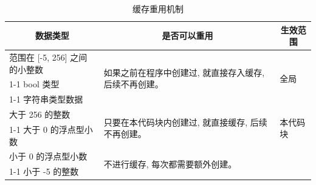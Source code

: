 \begin{table}[htpb]
\begin{tabular}{|l|ll|}
\hline
\multicolumn{1}{|c|}{\textbf{数据类型}} & \multicolumn{1}{c|}{\textbf{是否可以重用}}                              & \multicolumn{1}{c|}{\textbf{生效范围}} \\ \hline
范围在 {[}-5, 256{]} 之间的小整数            & \multicolumn{1}{l|}{\multirow{3}{*}{如果之前在程序中创建过, 就直接存入缓存, 后续不再创建。}} & \multirow{3}{*}{全局}                \\ \cline{1-1}
bool 类型                             & \multicolumn{1}{l|}{}                                             &                                    \\ \cline{1-1}
字符串类型数据                             & \multicolumn{1}{l|}{}                                             &                                    \\ \hline
大于 256 的整数                          & \multicolumn{1}{l|}{\multirow{2}{*}{只要在本代码块内创建过, 就直接缓存, 后续不再创建。}}   & \multirow{2}{*}{本代码块}              \\ \cline{1-1}
大于 0 的浮点型小数                         & \multicolumn{1}{l|}{}                                             &                                    \\ \hline
小于 0 的浮点型小数                         & \multicolumn{2}{l|}{\multirow{2}{*}{不进行缓存, 每次都需要额外创建。}}                                                 \\ \cline{1-1}
小于 -5 的整数                           & \multicolumn{2}{l|}{}                                                                                  \\ \hline
\end{tabular}
\caption{缓存重用机制}
\end{table}


